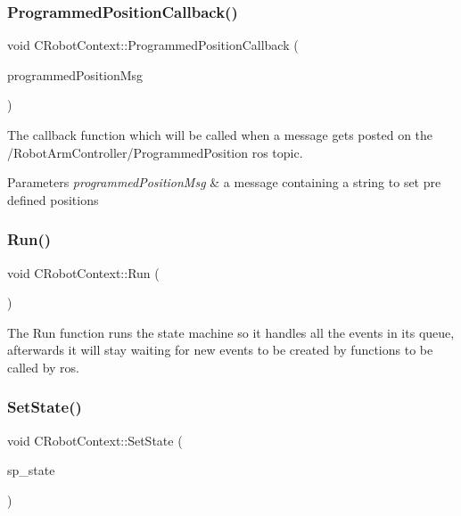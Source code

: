 \subsubsection{\texorpdfstring{Programmed\+Position\+Callback()}{ProgrammedPositionCallback()}}
{\footnotesize\ttfamily void C\+Robot\+Context\+::\+Programmed\+Position\+Callback (\begin{DoxyParamCaption}\item[{const Robot\+Arm\+Controller\+::\+Programmed\+Position\+::\+Const\+Ptr \&}]{programmed\+Position\+Msg }\end{DoxyParamCaption})}



The callback function which will be called when a message gets posted on the /\+Robot\+Arm\+Controller/\+Programmed\+Position ros topic. 


\begin{DoxyParams}{Parameters}
{\em programmed\+Position\+Msg} & a message containing a string to set pre defined positions \\
\hline
\end{DoxyParams}
\mbox{\label{classCRobotContext_af50652269de0b3977920d97345ac3606}} 
\subsubsection{\texorpdfstring{Run()}{Run()}}
{\footnotesize\ttfamily void C\+Robot\+Context\+::\+Run (\begin{DoxyParamCaption}{ }\end{DoxyParamCaption})}



The Run function runs the state machine so it handles all the events in its queue, afterwards it will stay waiting for new events to be created by functions to be called by ros. 

\mbox{\label{classCRobotContext_a34c126d70c235c1fdd60d028aea523d7}} 
\subsubsection{\texorpdfstring{Set\+State()}{SetState()}}
{\footnotesize\ttfamily void C\+Robot\+Context\+::\+Set\+State (\begin{DoxyParamCaption}\item[{std\+::shared\+\_\+ptr$<$ \hyperlink{classIRobotStates}{I\+Robot\+States} $>$}]{sp\+\_\+state }\end{DoxyParamCaption})}



